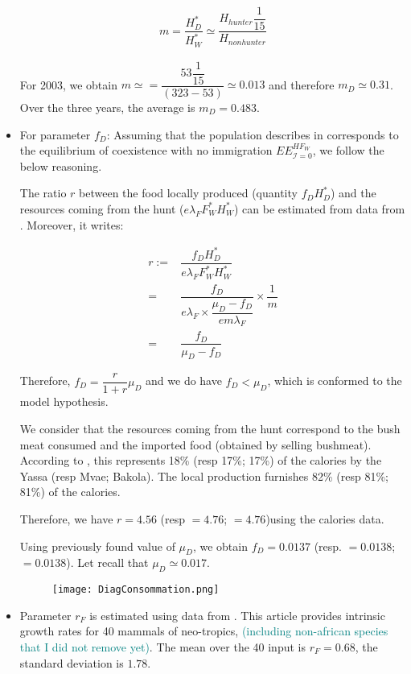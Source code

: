 \documentclass{article}
\newcommand{\marc}[1]{\textcolor{teal}{#1}}
\newcommand{\lfw}{\lambda_{F}}
\newcommand{\cI}{\mathcal{I}}
\begin{document}
\begin{itemize}
\begin{align*}
m = \dfrac{H_D^*}{H_W^*} \simeq \dfrac{H_{hunter} \dfrac{1}{15}}{H_{non hunter}}
\end{align*}

For 2003, we obtain $m \simeq = \dfrac{53\dfrac{1}{15}}{(323-53)} \simeq 0.013$ and therefore $m_D \simeq 0.31$. 
Over the three years, the average is $m_D = 0.483$.

\item For parameter $f_D$: Assuming that the population describes in \cite{koppert_consommation_1996} corresponds to the equilibrium of coexistence with no immigration $EE^{HF_W}_{\cI = 0}$, we follow the below reasoning.

The ratio $r$ between the food locally produced (quantity $f_D H_D^*$) and the resources coming from the hunt ($e \lfw F_W^* H_W^*$) can be estimated from data from \cite{koppert_consommation_1996}. Moreover, it writes:

\begin{align*}
r :=&  \dfrac{f_D H_D^*}{e \lfw F_W^* H_W^*} \\
=& \dfrac{f_D}{e \lfw \times \dfrac{\mu_D - f_D}{e m \lfw}} \times \dfrac{1}{m}\\
=& \dfrac{f_D}{\mu_D - f_D}
\end{align*}

Therefore, $f_D = \dfrac{r}{1 + r} \mu_D$ and we do have $f_D < \mu_D$, which is conformed to the model hypothesis.

We consider that the resources coming from the hunt correspond to the bush meat consumed and the imported food (obtained by selling bushmeat). According to \cite{koppert_consommation_1996}, this represents 18\% (resp 17\%; 17\%) of the calories by the Yassa (resp Mvae; Bakola). The local production furnishes 82\% (resp 81\%; 81\%) of the calories.

Therefore, we have $r = 4.56$ (resp $=4.76$; $=4.76$)using the calories data.

Using previously found value of $\mu_D$, we obtain $f_D = 0.0137$ (resp. $=0.0138$; $=0.0138$). Let recall that $\mu_D \simeq 0.017$.

 \begin{figure}[ht]
 \centering
 \texttt{[image: DiagConsommation.png]}
 \end{figure}

\item Parameter $r_F$ is estimated using data from \cite{robinson_intrinsic_1986}. This article provides intrinsic growth rates for 40 mammals of neo-tropics, \marc{(including non-african species that I did not remove yet)}. The mean over the 40 input is $r_F = 0.68$, the standard deviation is $1.78$.


\end{itemize}
\end{document}
